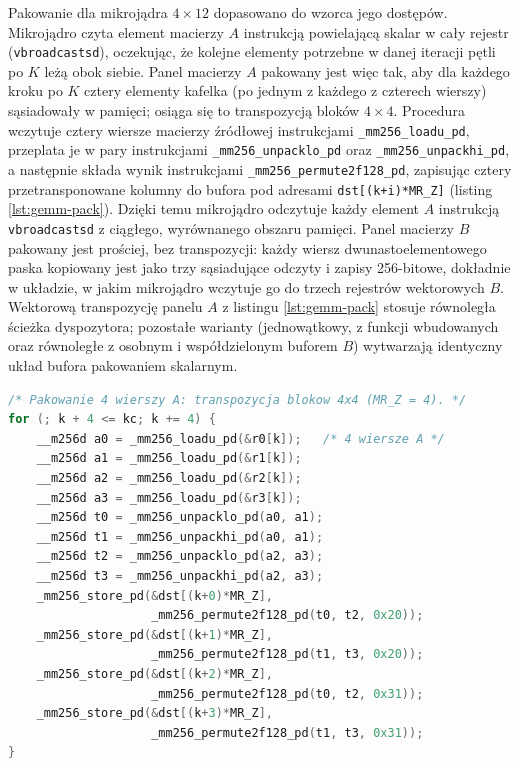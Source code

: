 \documentclass[a4paper,12pt]{book} %
\begin{document}
Pakowanie dla mikrojądra $4 \times 12$ dopasowano do wzorca jego dostępów. Mikrojądro czyta element macierzy $A$ instrukcją powielającą skalar w cały rejestr (\texttt{vbroadcastsd}), oczekując, że kolejne elementy potrzebne w danej iteracji pętli po $K$ leżą obok siebie. Panel macierzy $A$ pakowany jest więc tak, aby dla każdego kroku po $K$ cztery elementy kafelka (po jednym z każdego z czterech wierszy) sąsiadowały w pamięci; osiąga się to transpozycją bloków $4 \times 4$. Procedura wczytuje cztery wiersze macierzy źródłowej instrukcjami \texttt{\_mm256\_loadu\_pd}, przeplata je w pary instrukcjami \texttt{\_mm256\_unpacklo\_pd} oraz \texttt{\_mm256\_unpackhi\_pd}, a następnie składa wynik instrukcjami \texttt{\_mm256\_permute2f128\_pd}, zapisując cztery przetransponowane kolumny do bufora pod adresami \texttt{dst[(k+i)*MR\_Z]} (listing \ref{lst:gemm-pack}). Dzięki temu mikrojądro odczytuje każdy element $A$ instrukcją \texttt{vbroadcastsd} z ciągłego, wyrównanego obszaru pamięci. Panel macierzy $B$ pakowany jest prościej, bez transpozycji: każdy wiersz dwunastoelementowego paska kopiowany jest jako trzy sąsiadujące odczyty i zapisy 256-bitowe, dokładnie w układzie, w jakim mikrojądro wczytuje go do trzech rejestrów wektorowych $B$. Wektorową transpozycję panelu $A$ z listingu \ref{lst:gemm-pack} stosuje równoległa ścieżka dyspozytora; pozostałe warianty (jednowątkowy, z funkcji wbudowanych oraz równoległe z osobnym i współdzielonym buforem $B$) wytwarzają identyczny układ bufora pakowaniem skalarnym.

\begin{lstfloat}[t!]
\begin{lstlisting}[language=C, caption={Mnożenie dwóch macierzy --- pakowanie panelu A przez transpozycję bloków 4$\times$4 instrukcjami AVX2: cztery wiersze są przeplatane i permutowane tak, by mikrojądro czytało elementy A z ciągłej pamięci instrukcją \texttt{vbroadcastsd}}, label={lst:gemm-pack}]
/* Pakowanie 4 wierszy A: transpozycja blokow 4x4 (MR_Z = 4). */
for (; k + 4 <= kc; k += 4) {
    __m256d a0 = _mm256_loadu_pd(&r0[k]);   /* 4 wiersze A */
    __m256d a1 = _mm256_loadu_pd(&r1[k]);
    __m256d a2 = _mm256_loadu_pd(&r2[k]);
    __m256d a3 = _mm256_loadu_pd(&r3[k]);
    __m256d t0 = _mm256_unpacklo_pd(a0, a1);
    __m256d t1 = _mm256_unpackhi_pd(a0, a1);
    __m256d t2 = _mm256_unpacklo_pd(a2, a3);
    __m256d t3 = _mm256_unpackhi_pd(a2, a3);
    _mm256_store_pd(&dst[(k+0)*MR_Z],
                    _mm256_permute2f128_pd(t0, t2, 0x20));
    _mm256_store_pd(&dst[(k+1)*MR_Z],
                    _mm256_permute2f128_pd(t1, t3, 0x20));
    _mm256_store_pd(&dst[(k+2)*MR_Z],
                    _mm256_permute2f128_pd(t0, t2, 0x31));
    _mm256_store_pd(&dst[(k+3)*MR_Z],
                    _mm256_permute2f128_pd(t1, t3, 0x31));
}
\end{lstlisting}
\end{lstfloat}
\end{document}
